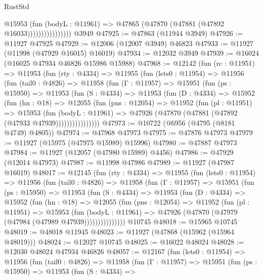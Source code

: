 \begin{lexlean}{RustStd}
\begin{coremodule}
                          @15953
                            (fun (bodyL : @11961) =>
                            @47865 (@47870 (@47881 (@47892 @16033))))))))))))))))
    @3949
@47925 := @47863 (@11944 @3949)
@47926 := @11927 @47925
@47929 := @12006 (@12007 @3949) @46823
@47933 := @11927 (@11998 (@47929 @16015) @16019)
@47934 := @12032 @3949
@47939 := @16024 (@16025 @47934 @46826 @15986 @15988)
@47968 := @12142
    (fun (rc : @11951) =>
    @11953
      (fun (rty : @4334) =>
      @11955
        (fun (lets0 : @11954) =>
        @11956
          (fun (tail0 : @4826) =>
          @11958
            (fun (Γ : @11957) =>
            @15951
              (fun (ps : @15950) =>
              @11953
                (fun (S : @4334) =>
                @11953
                  (fun (D : @4334) =>
                  @15952
                    (fun (hn : @18) =>
                    @12055
                      (fun (pns : @12054) =>
                      @11952
                        (fun (pl : @11951) =>
                        @15953
                          (fun (bodyL : @11961) =>
                          @47926 (@47870 (@47881 (@47892 (@47933 @47939))))))))))))))))
@47973 := @10722 (@6956 (@4795 (@8181 @4749) @4805))
@47974 := @47968 @47973
@47975 := @47876 @47973
@47979 := @11927 (@15975 (@47975 @15989) @15996)
@47980 := @47887 @47973
@47984 := @11927 (@12057 (@47980 @15989) @4456)
@47986 := @47929 (@12014 @47973)
@47987 := @11998 @47986
@47989 := @11927 (@47987 @16019)
@48017 := @12145
    (fun (rty : @4334) =>
    @11955
      (fun (lets0 : @11954) =>
      @11956
        (fun (tail0 : @4826) =>
        @11958
          (fun (Γ : @11957) =>
          @15951
            (fun (ps : @15950) =>
            @11953
              (fun (S : @4334) =>
              @11953
                (fun (D : @4334) =>
                @15952
                  (fun (hn : @18) =>
                  @12055
                    (fun (pns : @12054) =>
                    @11952
                      (fun (pl : @11951) =>
                      @15953
                        (fun (bodyL : @11961) =>
                        @47926 (@47870 (@47979 (@47984 (@47989 @47939)))))))))))))))
    @10745
@48018 := @15965 @10745
@48019 := @48018 @11945
@48023 := @11927 (@47868 (@15962 (@15964 @48019)))
@48024 := @12027 @10745
@48025 := @16022 @48024
@48028 := @12030 @48024 @47934 @46826
@48057 := @12167
    (fun (lets0 : @11954) =>
    @11956
      (fun (tail0 : @4826) =>
      @11958
        (fun (Γ : @11957) =>
        @15951
          (fun (ps : @15950) =>
          @11953
            (fun (S : @4334) =>

\end{coremodule}
\end{lexlean}
